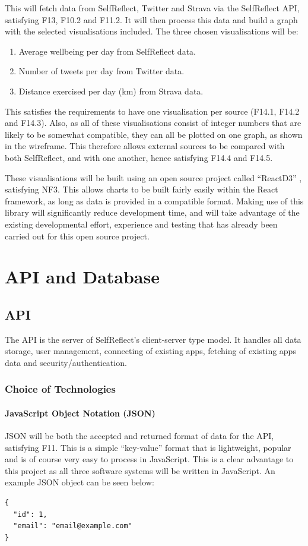 \documentclass[11pt,openright,a4paper]{report}
\begin{document}
\newpage
This will fetch data from SelfReflect, Twitter and Strava via the SelfReflect API, satisfying F13, F10.2 and F11.2. It will then process this data and build a graph with the selected visualisations included. The three chosen visualisations will be:
\begin{enumerate}
\item Average wellbeing per day from SelfReflect data.
\item Number of tweets per day from Twitter data.
\item Distance exercised per day (km) from Strava data.
\end{enumerate}

This satisfies the requirements to have one visualisation per source (F14.1, F14.2 and F14.3). Also, as all of these visualisations consist of integer numbers that are likely to be somewhat compatible, they can all be plotted on one graph, as shown in the wireframe. This therefore allows external sources to be compared with both SelfReflect, and with one another, hence satisfying F14.4 and F14.5.

These visualisations will be built using an open source project called \enquote{ReactD3} \parencite{reactd3}, satisfying NF3. This allows charts to be built fairly easily within the React framework, as long as data is provided in a compatible format. Making use of this library will significantly reduce development time, and will take advantage of the existing developmental effort, experience and testing that has already been carried out for this open source project.

\section{API and Database}
\subsection{API}
The API is the server of SelfReflect's client-server type model. It handles all data storage, user management, connecting of existing apps, fetching of existing apps data and security/authentication.

\subsubsection{Choice of Technologies}
\paragraph{JavaScript Object Notation (JSON)}
JSON will be both the accepted and returned format of data for the API, satisfying F11. This is a simple \enquote{key-value} format that is lightweight, popular and is of course very easy to process in JavaScript. This is a clear advantage to this project as all three software systems will be written in JavaScript. An example JSON object can be seen below:
\begin{lstlisting}
{
  "id": 1,
  "email": "email@example.com"
}
\end{lstlisting}
\end{document}
